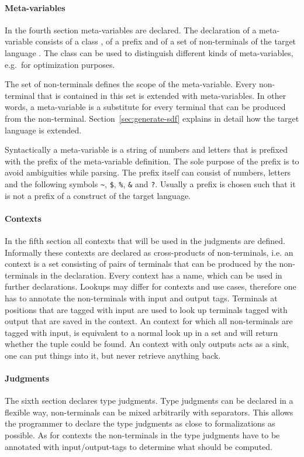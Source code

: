 \paragraph{Meta-variables} In the fourth section meta-variables are
declared. The declaration of a meta-variable consists of a class
, of a prefix 
and of a set of non-terminals of the target language
. The class can be used to distinguish
different kinds of meta-variables, e.g.\ for optimization
purposes. 

The set of non-terminals defines the scope of the meta-variable. Every
non-terminal that is contained in this set is extended with
meta-variables. In other words, a meta-variable is a substitute for
every terminal that can be produced from the
non-terminal. Section~\ref{sec:generate-sdf} explains in detail how
the target language is extended.

Syntactically a meta-variable is a string of numbers and letters that
is prefixed with the prefix of the meta-variable definition. The sole
purpose of the prefix is to avoid ambiguities while parsing. The
prefix itself can consist of numbers, letters and the following
symbols \verb|~|, \verb|$|, \verb|%|, \verb|&| and \verb|?|.
 Usually a prefix is chosen such that it
is not a prefix of a construct of the target language.

\paragraph{Contexts} In the fifth section all contexts that will be
used in the judgments are defined. Informally these contexts are
declared as cross-products of non-terminals, i.e. an context is a set
consisting of pairs of terminals that can be produced by the
non-terminals in the declaration. Every context has a name, which can
be used in further declarations. Lookups may differ for contexts and
use cases, therefore one has to annotate the non-terminals with input
and output tags. Terminals at positions that are tagged with input are
used to look up terminals tagged with output that are saved in the
context. An context for which all non-terminals are tagged with input,
is equivalent to a normal look up in a set and will return whether the
tuple could be found. An context with only outputs acts as a sink, one
can put things into it, but never retrieve anything back.

\paragraph{Judgments} The sixth section declares type judgments. Type
judgments can be declared in a flexible way, non-terminals can be
mixed arbitrarily with separators. This allows the programmer to declare the type judgments as close to
formalizations as possible. As for contexts the non-terminals in the
type judgments have to be annotated with input/output-tags to
determine what should be computed.

